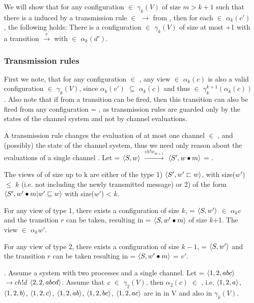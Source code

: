 We will show that for any configuration  $\in$ $\gamma_k(V)$ of size $m > k + 1$ such that there is a  induced by a transmission rule  $\in$ $\rightarrow$ from , then for each  $\in$ $\alpha_k(c')$, the following holds: There is a configuration  $\in$ $\gamma_k(V)$ of size at most +1 with a transition  $\xrightarrow{r}$  with  $\in$ $\alpha_k(d')$. 

\subsubsection{Transmission rules}
\label{proofTransmission}
First we note, that for any configuration  $\in$ , any view  $\in$ $\alpha_k(c)$ is also a valid configuration  $\in$ $\gamma_k(V)$, since $\alpha_k(v')$ $\subseteq$ $\alpha_k(c)$ and thus  $\in$ $\gamma_k^{k+1}(\alpha_k(c))$. Also note that if from  a transition  can be fired, then this transition can also be fired from any configuration  = , as transmission rules are guarded only by the states of the channel system and not by channel evaluations.

A transmission rule changes the evaluation of at most one channel  $\in$ , and (possibly) the state of the channel system, thus we need only reason about the evaluations of a single channel .
Let  = $\langle S, w\rangle$ $\xrightarrow{ch!w_{m+1}}$ $\langle S', w \bullet m\rangle$ = .

The views of  of size up to k are either of the type 1) $\langle S', w' \sqsubset w\rangle$, with size($w'$) $\leq$ $k$ (i.e. not including the newly transmitted message) or 2) of the form $\langle S', w' \bullet m | w' \sqsubseteq w\rangle$ with size($w'$) < $k$.

For any view of type 1, there exists a configuration of size $k$,  = $\langle S, w'\rangle$ $\in$ $\alpha_k{c}$ and the transition $r$ can be taken, resulting in  = $\langle S, w'\bullet m\rangle$ of size $k$+1. The view  $\in$ $\alpha_k{w'}$.

For any view of type 2, there exists a configuration of size $k-1$,  = $\langle S, w'\rangle$ and the transition $r$ can be taken resulting in  = $\langle S, w'\bullet m\rangle$ = $v'$.

. Assume a system with two processes and a single channel. Let  = $\langle1,2,abc\rangle$ $\rightarrow{ch!d}$ $\langle2,2,abcd\rangle$. Assume that $\emph{c}$ $\in$ $\gamma_2(V)$, then $\alpha_2(c)$ $\in$ , i.e. 
$\langle1,2,a\rangle$, $\langle1,2,b\rangle$, $\langle1,2,c\rangle$, $\langle1,2,ab\rangle$, $\langle1,2,bc\rangle$, $\langle1,2,ac\rangle$ are in in V and also in $\gamma_k(V)$.

